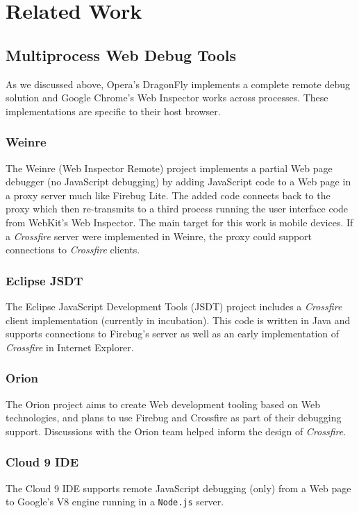 
\section{Related Work}
\subsection{Multiprocess Web Debug Tools}
As we discussed above, 
Opera's DragonFly\cite{dragonfly} implements a complete remote debug solution and 
Google Chrome's Web Inspector works across processes. These implementations are specific to their host browser.


\subsubsection{Weinre}
The Weinre (Web Inspector Remote)\cite{weinre} project implements a partial Web page debugger (no JavaScript debugging) by 
adding JavaScript code to a Web page in a proxy server much like Firebug Lite. The 
added code connects back to the proxy which then re-transmits to a third process running
the user interface code
from WebKit's Web Inspector. The main target for this work is mobile devices. If 
a \textit{Crossfire} server were implemented in Weinre, the proxy could support connections to 
 \textit{Crossfire} clients.

\subsubsection{Eclipse JSDT}
The Eclipse JavaScript Development Tools (JSDT) project\cite{EclipseJSDT}
includes a \textit{Crossfire} client implementation (currently in incubation).
 This code is written in Java and supports
connections to Firebug's server as well as an early implementation of \textit{Crossfire} in Internet Explorer.

\subsubsection{Orion}
The Orion project\cite{orion} aims to create Web development tooling based on
Web technologies, and plans to use Firebug and Crossfire as part of their
debugging support. Discussions with the Orion team helped inform the design of \textit{Crossfire}.

\subsubsection{Cloud 9 IDE}
The Cloud 9 IDE\cite{cloud9} supports remote JavaScript debugging (only) from a Web page to Google's V8 
engine running in a \texttt{Node.js} server. 


